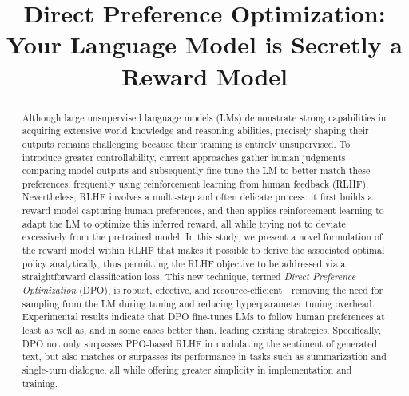\title{Direct Preference Optimization: Your Language Model is Secretly a Reward Model}

\begin{abstract}
Although large unsupervised language models (LMs) demonstrate strong capabilities in acquiring extensive world knowledge and reasoning abilities, precisely shaping their outputs remains challenging because their training is entirely unsupervised. To introduce greater controllability, current approaches gather human judgments comparing model outputs and subsequently fine-tune the LM to better match these preferences, frequently using reinforcement learning from human feedback (RLHF). Nevertheless, RLHF involves a multi-step and often delicate process: it first builds a reward model capturing human preferences, and then applies reinforcement learning to adapt the LM to optimize this inferred reward, all while trying not to deviate excessively from the pretrained model. In this study, we present a novel formulation of the reward model within RLHF that makes it possible to derive the associated optimal policy analytically, thus permitting the RLHF objective to be addressed via a straightforward classification loss. This new technique, termed \textit{Direct Preference Optimization} (DPO), is robust, effective, and resource-efficient—removing the need for sampling from the LM during tuning and reducing hyperparameter tuning overhead. Experimental results indicate that DPO fine-tunes LMs to follow human preferences at least as well as, and in some cases better than, leading existing strategies. Specifically, DPO not only surpasses PPO-based RLHF in modulating the sentiment of generated text, but also matches or surpasses its performance in tasks such as summarization and single-turn dialogue, all while offering greater simplicity in implementation and training.
\end{abstract}

